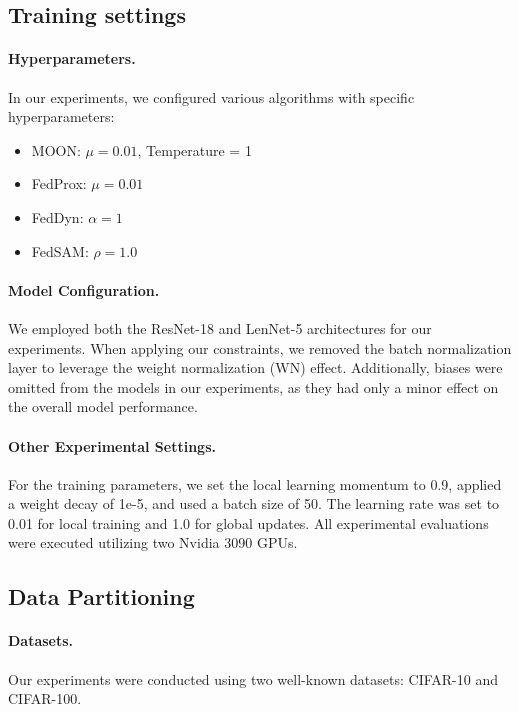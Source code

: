 \documentclass{article}
\theoremstyle{plain}
\theoremstyle{definition}
\theoremstyle{remark}
\begin{document}
\subsection{Training settings}
\paragraph{Hyperparameters.}
In our experiments, we configured various algorithms with specific hyperparameters:
\begin{itemize}
    \item MOON: $\mu = 0.01$, Temperature = 1
    \item FedProx: $\mu = 0.01$
    \item FedDyn: $\alpha = 1$
    \item FedSAM: $\rho  = 1.0$
\end{itemize}
\paragraph{Model Configuration.} We employed both the ResNet-18 and LenNet-5 architectures for our experiments. When applying our constraints, we removed the batch normalization layer to leverage the weight normalization (WN) effect. Additionally, biases were omitted from the models in our experiments, as they had only a minor effect on the overall model performance.
\paragraph{Other Experimental Settings.}
For the training parameters, we set the local learning momentum to 0.9, applied a weight decay of 1e-5, and used a batch size of 50. The learning rate was set to 0.01 for local training and 1.0 for global updates. All experimental evaluations were executed utilizing two Nvidia 3090 GPUs. 

\subsection{Data Partitioning}
\paragraph{Datasets.}
Our experiments were conducted using two well-known datasets: CIFAR-10 and CIFAR-100.
\end{document}

